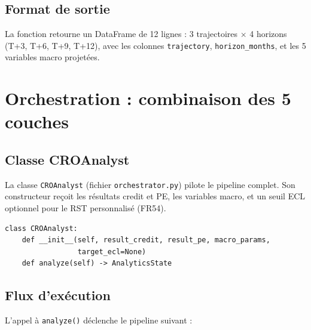 \documentclass[12pt,a4paper]{article}
\begin{document}
\subsection{Format de sortie}

La fonction retourne un DataFrame de 12 lignes :
3 trajectoires $\times$ 4 horizons (T+3, T+6, T+9, T+12),
avec les colonnes \texttt{trajectory}, \texttt{horizon\_months}, et les 5 variables
macro projet\'ees.


\newpage
\section{Orchestration : combinaison des 5 couches}

\subsection{Classe CROAnalyst}

La classe \texttt{CROAnalyst} (fichier \texttt{orchestrator.py}) pilote le pipeline
complet. Son constructeur re\c{c}oit les r\'esultats credit et PE, les variables macro,
et un seuil ECL optionnel pour le RST personnalis\'e (FR54).

\begin{verbatim}
class CROAnalyst:
    def __init__(self, result_credit, result_pe, macro_params,
                 target_ecl=None)
    def analyze(self) -> AnalyticsState
\end{verbatim}

\subsection{Flux d'ex\'ecution}

L'appel \`a \texttt{analyze()} d\'eclenche le pipeline suivant :
\end{document}
